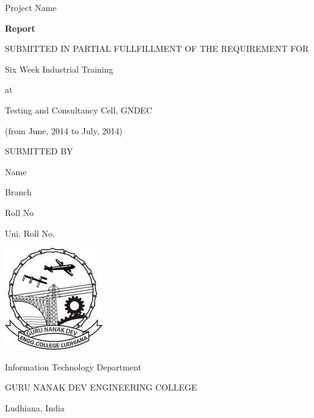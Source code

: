 \thispagestyle{empty}
\begin{center}  
{\fontsize{24}{30}\selectfont Project Name}
\vspace*{3\baselineskip}

{\bfseries\fontsize{14}{30}\selectfont Report}

\vspace*{1\baselineskip}

SUBMITTED IN PARTIAL FULLFILLMENT OF THE REQUIREMENT FOR    

Six Week Industrial Training

\vspace*{2\baselineskip}

at

\vspace*{2\baselineskip}

{\bfseries\fontsize{14}{20}\selectfont 

Testing and Consultancy Cell, GNDEC

     
(from June, 2014 to July, 2014)

}

\vspace*{3\baselineskip}    

SUBMITTED BY

\vspace*{\baselineskip}

{\fontsize{14}{15}\selectfont

Name

Branch

Roll No

Uni. Roll No.
}

\vspace*{3\baselineskip}
\includegraphics[scale=0.6]{images/gne.jpg}
\vspace*{4\baselineskip}
\begin{flushbottom}
{\bfseries\fontsize{14}{20}\selectfont 

Information Technology Department

GURU NANAK DEV ENGINEERING COLLEGE}

{\fontsize{14}{15}\selectfont Ludhiana, India}


\end{flushbottom}
\end{center}
